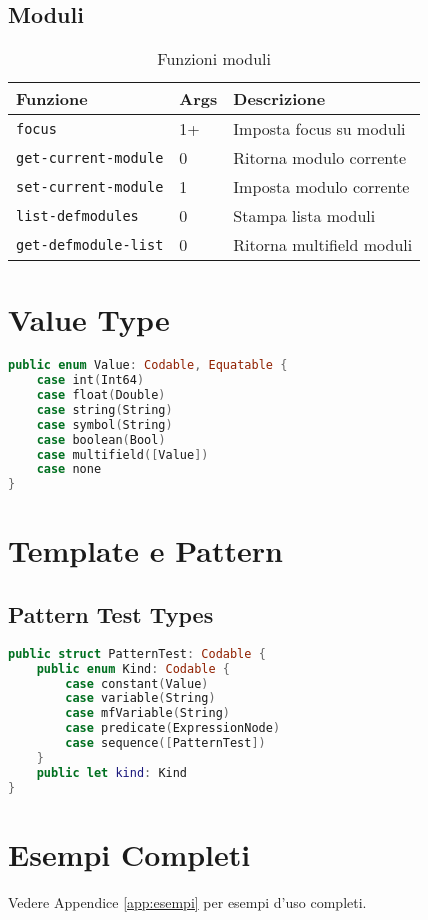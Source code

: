 \subsection{Moduli}

\begin{table}[h]
\centering
\small
\begin{tabular}{@{}llp{5cm}@{}}
\toprule
\textbf{Funzione} & \textbf{Args} & \textbf{Descrizione} \\
\midrule
\texttt{focus} & 1+ & Imposta focus su moduli \\
\texttt{get-current-module} & 0 & Ritorna modulo corrente \\
\texttt{set-current-module} & 1 & Imposta modulo corrente \\
\texttt{list-defmodules} & 0 & Stampa lista moduli \\
\texttt{get-defmodule-list} & 0 & Ritorna multifield moduli \\
\bottomrule
\end{tabular}
\caption{Funzioni moduli}
\label{tab:api_modules}
\end{table}

\section{Value Type}

\begin{lstlisting}[language=Swift]
public enum Value: Codable, Equatable {
    case int(Int64)
    case float(Double)
    case string(String)
    case symbol(String)
    case boolean(Bool)
    case multifield([Value])
    case none
}
\end{lstlisting}

\section{Template e Pattern}

\subsection{Pattern Test Types}

\begin{lstlisting}[language=Swift]
public struct PatternTest: Codable {
    public enum Kind: Codable {
        case constant(Value)
        case variable(String)
        case mfVariable(String)
        case predicate(ExpressionNode)
        case sequence([PatternTest])
    }
    public let kind: Kind
}
\end{lstlisting}

\section{Esempi Completi}

Vedere Appendice \ref{app:esempi} per esempi d'uso completi.

